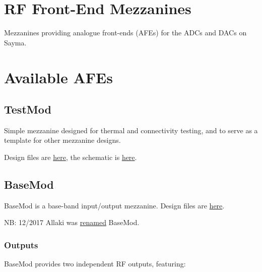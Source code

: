\section{RF Front-End Mezzanines}\label{rf-front-end-mezzanines}

Mezzanines providing analogue front-ends (AFEs) for the ADCs and DACs on
Sayma.

\section{Available AFEs}\label{available-afes}

\subsection{TestMod}\label{testmod}

Simple mezzanine designed for thermal and connectivity testing, and to
serve as a template for other mezzanine designs.


Design files are
\href{https://github.com/m-labs/sinara/tree/master/ARTIQ_ALTIUM/Sayma_AFEs/TestMod}{here},
the schematic is
\href{https://github.com/m-labs/sinara/tree/master/ARTIQ_ALTIUM/Sayma_AFEs/TestMod/AFE_mezzanine.PDF}{here}.


\subsection{BaseMod}\label{basemod}

BaseMod is a base-band input/output mezzanine. Design files are
\href{https://github.com/m-labs/sinara/tree/master/ARTIQ_ALTIUM/Sayma_AFEs/BaseMod}{here}.

NB: 12/2017 Allaki was
\href{https://github.com/m-labs/sinara/issues/396}{renamed} BaseMod.


\subsubsection{Outputs}\label{outputs}

BaseMod provides two independent RF outputs, featuring:

